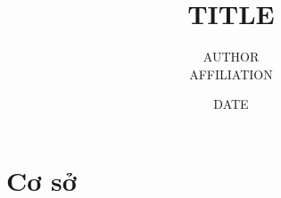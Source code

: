 \documentclass[openany]{book}
\title{{{TITLE}}}
\author{{{AUTHOR}} \\ {{AFFILIATION}}}
\date{{{DATE}}}
\begin{document}
\maketitle
\tableofcontents
\part{Cơ sở}



\appendix



\end{document}

